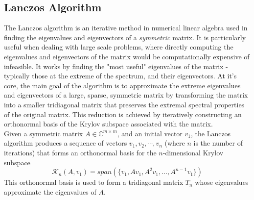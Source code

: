 \subsection{Lanczos Algorithm}\label{section2.10}
The Lanczos algorithm is an iterative method in numerical linear algebra used in finding the eigenvalues and eigenvectors of a \textit{symmetric} matrix. It is particularly useful when dealing with large scale problems, where directly computing the eigenvalues and eigenvectors of the matrix would be computationally expensive of infeasible. It works by finding the "most useful" eigenvalues of the matrix - typically those at the extreme of the spectrum, and their eigenvectors. At it's core, the main goal of the algorithm is to approximate the extreme eigenvalues and eigenvectors of a large, sparse, symmetric matrix by transforming the matrix into a smaller tridiagonal matrix that preserves the extremal spectral properties of the original matrix. This reduction is achieved by iteratively constructing an orthonormal basis of the Krylov subspace associated with the matrix.\\
Given a symmetric matrix $A \in \mathbb{C}^{m\times m}$, and an initial vector $v_1$, the Lanczos algorithm produces a sequence of vectors $v_1, v_2, \cdots, v_n$ (where $n$ is the number of iterations) that forms an orthonormal basis for the $n$-dimensional Krylov subspace
\begin{equation}
	\mathcal{K}_n(A, v_1) = span(\{v_1, Av_1, A^2v_1, \ldots, A^{n-1}v_1\})
\end{equation}
This orthonormal basis is used to form a tridiagonal matrix $T_n$ whose eigenvalues approximate the eigenvalues of $A$.
